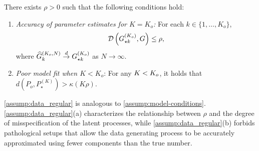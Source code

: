\begin{assumption} \label{assump:data_regular} 
	There exists $\rho > 0$ such that the following conditions hold: 
	\begin{enumerate}[label={(\alph*)}]
	\item \emph{Accuracy of parameter estimates for $K=K_{o}$:} For each $k \in \{1, \dots, K_{o}\}$,
      \[
        \mathcal{D}\left(G^{(K_{o})}_{\star k},  G\right)\leq\rho,
      \]
      where $\widehat{G}^{(K_{o},N)}_{k}\overset{d}{\to} G^{(K_{o})}_{\star k}$ as $N\to\infty$.
    \item \emph{Poor model fit when $K<K_{o}$}: For any $K < K_o$, 
    it holds that $d(P_{o}, P^{(K)}_{\star})>\kappa(K\rho)$.
	\end{enumerate}
\end{assumption}
\cref{assump:data_regular} is analogous to \cref{assump:model-conditions}. \cref{assump:data_regular}(a) characterizes the relationship between $\rho$ and the degree of misspecification of the latent processes, while \cref{assump:data_regular}(b) forbids pathological setups that allow the data generating process to be accurately approximated using fewer components than the true number.


